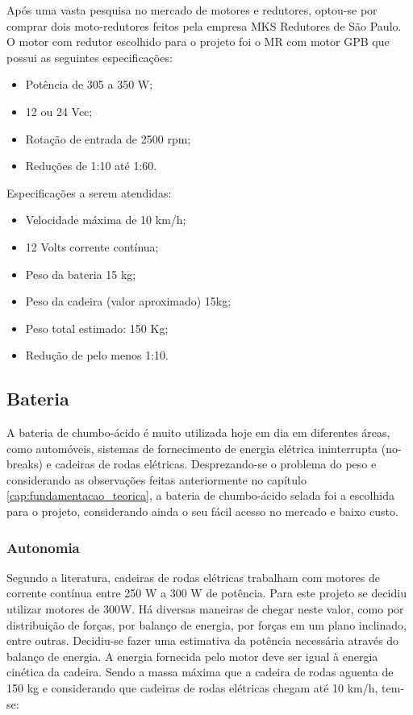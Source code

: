 Após uma vasta pesquisa no mercado de motores e redutores, optou-se por comprar dois moto-redutores feitos pela empresa MKS Redutores de São Paulo. O motor com redutor escolhido para o projeto foi o MR com motor GPB que possui as seguintes especificações:

\begin{itemize}
  \item Potência de 305 a 350 W;
  \item 12 ou 24 Vcc;
  \item Rotação de entrada de 2500 rpm;
  \item Reduções de 1:10 até 1:60.
\end{itemize}

Especificações a serem atendidas:

\begin{itemize}
  \item Velocidade máxima de 10 km/h;
  \item 12 Volts corrente contínua;
  \item Peso da bateria 15 kg;
  \item Peso da cadeira (valor aproximado) 15kg;
  \item Peso total estimado: 150 Kg;
  \item Redução de pelo menos 1:10.
\end{itemize}

\subsection{Bateria}

A bateria de chumbo-ácido é muito utilizada hoje em dia em diferentes áreas, como automóveis, sistemas de fornecimento de energia elétrica ininterrupta (no-breaks) e cadeiras de rodas elétricas. Desprezando-se o problema do peso e considerando as observações feitas anteriormente no capítulo \ref{cap:fundamentacao_teorica}, a bateria de chumbo-ácido selada foi a escolhida para o projeto, considerando ainda o seu fácil acesso no mercado e baixo custo.

\subsubsection{Autonomia}

Segundo a literatura, cadeiras de rodas elétricas trabalham com motores de corrente contínua entre 250 W a 300 W de potência. Para este projeto se decidiu utilizar motores de 300W. Há diversas maneiras de chegar neste valor, como por distribuição de forças, por balanço de energia, por forças em um plano inclinado, entre outras. Decidiu-se fazer uma estimativa da potência necessária através do balanço de energia.
A energia fornecida pelo motor deve ser igual à energia cinética da cadeira. Sendo a massa máxima que a cadeira de rodas aguenta de 150 kg e considerando que cadeiras de rodas elétricas chegam até 10 km/h, tem-se:

